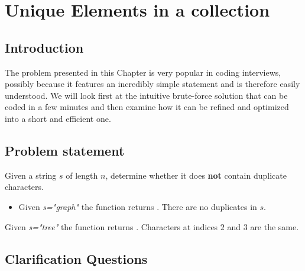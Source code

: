 %


\chapter{Unique Elements in a collection}
\label{ch:unique_elements}
\section*{Introduction}
The problem presented in this Chapter is very popular in coding interviews, 
possibly because it features an incredibly simple statement and is therefore easily understood.
We will look first at the intuitive brute-force solution that can be coded in a few minutes and then examine how it 
can be refined and optimized into a short and efficient one. 

\section{Problem statement}
\begin{exercise}
Given a string $s$ of length $n$, determine whether it does \textbf{not} contain duplicate characters. 

\begin{example}
\hfill
	\begin{itemize}
		\item Given \textit{s="graph"} the function returns . There are no duplicates  in $s$.
	\end{itemize}
\end{example}

	\begin{example}
		Given \textit{s="tree"} the function returns . Characters at indices $2$ and $3$  are the same.
	\end{example}

\end{exercise}

\section{Clarification Questions}

